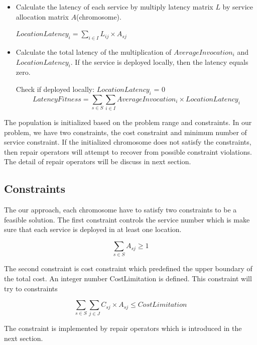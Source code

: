 \documentclass[twoside]{article}
\begin{document}
\begin{itemize}
\begin{itemize}
			\item Calculate the latency of each service by multiply latency matrix $L$ by service allocation matrix $A$(chromosome).
				\begin{center}
					$LocationLatency_{i} = \sum\limits_{i \in I} L_{ij} \times A_{sj}$
				\end{center}

			\item Calculate the total latency of the multiplication of $AverageInvocation_{i}$ and $LocationLatency_{i}$.
				If the service is deployed locally, then the latency equals zero.
				\begin{center}
						Check if deployed locally: $LocationLatency_{i}$ = 0
				\begin{equation}
						LatencyFitness = \sum\limits_{s \in S}\sum\limits_{i \in I} AverageInvocation_{i} \times LocationLatency_{i}
				\end{equation}
				\end{center}
		\end{itemize}
\end{itemize}
The population is initialized based on the problem range and constraints. 
In our problem, we have two constraints, the cost constraint and minimum number of service constraint. 
If the initialized chromosome does not satisfy the constraints, then repair operators will attempt to 
recover from possible constraint violations. The detail of repair operators will be discuss in next section.
\subsection{Constraints}
The our approach, each chromosome have to satisfy two constraints to be a feasible solution.
The first constraint controls the service number which is make sure that each service is deployed in at 
least one location.
\begin{center}
	\begin{equation}
		\sum\limits_{s \in S} A_{sj} \geq 1
	\end{equation}
\end{center}

The second constraint is cost constraint which predefined the upper boundary of the total cost.
An integer number CostLimitation is defined. This constraint will try to constraints
\begin{center}
	\begin{equation}
		\sum\limits_{s \in S} \sum\limits_{j \in J} C_{sj} \times A_{sj} \leq CostLimitation
	\end{equation}
\end{center}
The constraint is implemented by repair operators which is introduced in the next section.
\end{document}
